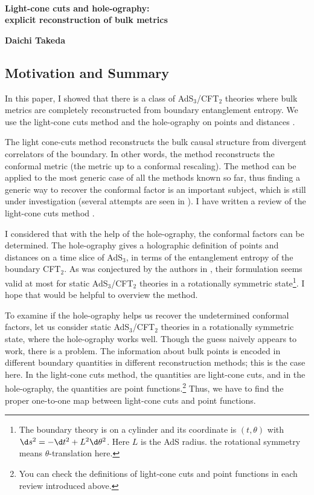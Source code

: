 \documentclass[12pt]{article}
\date{}
\renewcommand{\thefootnote}{\fnsymbol{footnote}}
\begin{document}
{\Large{}\\[2mm]
\textbf{Light-cone cuts and hole-ography:\\explicit reconstruction of bulk metrics
\cite{Takeda:2021dsl}
}
}

\noindent
\hfill
\textbf{Daichi Takeda}%

\renewcommand{\thefootnote}{\arabic{footnote})}
\setcounter{footnote}{0}
\vspace{12pt}
\subsection*{Motivation and Summary}
In this paper, I showed that there is a class of AdS$_3$/CFT$_2$ theories where bulk metrics are completely
reconstructed from boundary entanglement entropy.
We use the light-cone cuts method \cite{Engelhardt:2016wgb} and 
the hole-ography on points and distances \cite{Czech:2014ppa}.

The light cone-cuts method reconstructs the bulk causal structure from divergent correlators of the boundary.
In other words, the method reconstructs the conformal metric (the metric up to a conformal rescaling).
The method can be applied to the most generic case of all the methods known so far,
thus finding a generic way to recover the conformal factor is an important subject,
which is still under investigation (several attempts are seen in \cite{Engelhardt:2016crc}).
I have written a review of the light-cone cuts method
\hyperlink{https://albertmcc.github.io/web/reviews/light_cone1.pdf}{\color{blue}{here}}.

I considered that with the help of the hole-ography, the conformal factors can be determined.
The hole-ography gives a holographic definition of points and distances on a time slice of AdS$_3$,
in terms of the entanglement entropy of the boundary CFT$_2$.
As was conjectured by the authors in \cite{Czech:2014ppa},
their formulation seems valid at most for static AdS$_3$/CFT$_2$ theories in a rotationally symmetric state\footnote{
The boundary theory is on a cylinder and its coordinate is $(t,\theta)$ with $\d s^2 = -\d t^2 + L^2\d\theta^2$.
Here $L$ is the AdS radius.
the rotational symmetry means $\theta$-translation here.
}.
I hope that 
\hyperlink{https://albertmcc.github.io/web/reviews/Nuts_and_Bolts_for_Creating_space.pdf}{\color{blue}{my review}}
would be helpful to overview the method.

To examine if the hole-ography helps us recover the undetermined conformal factors,
let us consider static AdS$_3$/CFT$_2$ theories in a rotationally symmetric state,
where the hole-ography works well.
Though the guess naively appears to work, there is a problem.
The information about bulk points is encoded in different boundary quantities in different reconstruction methods;
this is the case here.
In the light-cone cuts method, the quantities are light-cone cuts, and in the hole-ography,
the quantities are point functions.\footnote{
You can check the definitions of light-cone cuts and point functions in each review introduced above.
}
Thus, we have to find the proper one-to-one map between light-cone cuts and point functions.
\end{document}
